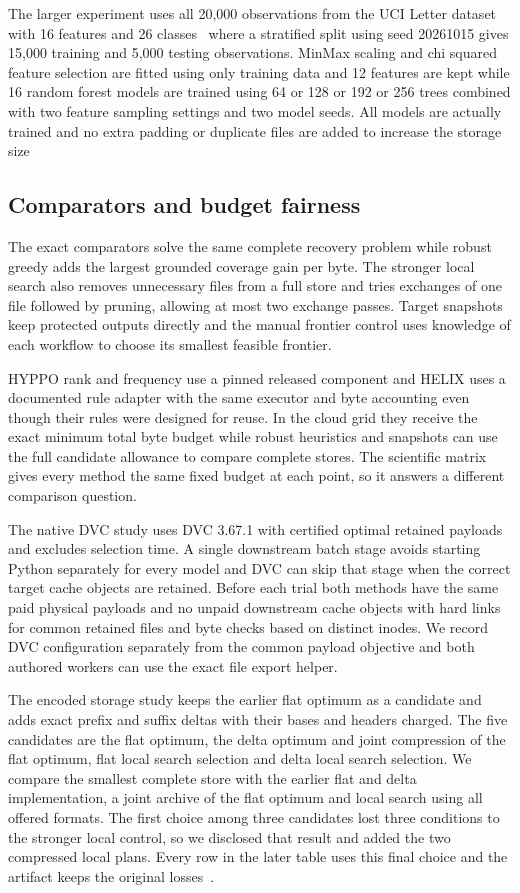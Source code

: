 The larger experiment uses all 20,000 observations from the UCI Letter dataset with 16 features and 26 classes~\cite{letter} where a stratified split using seed 20261015 gives 15,000 training and 5,000 testing observations. MinMax scaling and chi squared feature selection are fitted using only training data and 12 features are kept while 16 random forest models are trained using 64 or 128 or 192 or 256 trees combined with two feature sampling settings and two model seeds. All models are actually trained and no extra padding or duplicate files are added to increase the storage size

\subsection{Comparators and budget fairness}

The exact comparators solve the same complete recovery problem while robust greedy adds the largest grounded coverage gain per byte. The stronger local search also removes unnecessary files from a full store and tries exchanges of one file followed by pruning, allowing at most two exchange passes. Target snapshots keep protected outputs directly and the manual frontier control uses knowledge of each workflow to choose its smallest feasible frontier.

HYPPO rank and frequency use a pinned released component and HELIX uses a documented rule adapter with the same executor and byte accounting even though their rules were designed for reuse. In the cloud grid they receive the exact minimum total byte budget while robust heuristics and snapshots can use the full candidate allowance to compare complete stores. The scientific matrix gives every method the same fixed budget at each point, so it answers a different comparison question.

The native DVC study uses DVC 3.67.1 with certified optimal retained payloads and excludes selection time. A single downstream batch stage avoids starting Python separately for every model and DVC can skip that stage when the correct target cache objects are retained. Before each trial both methods have the same paid physical payloads and no unpaid downstream cache objects with hard links for common retained files and byte checks based on distinct inodes. We record DVC configuration separately from the common payload objective and both authored workers can use the exact file export helper.

The encoded storage study keeps the earlier flat optimum as a candidate and adds exact prefix and suffix deltas with their bases and headers charged. The five candidates are the flat optimum, the delta optimum and joint compression of the flat optimum, flat local search selection and delta local search selection. We compare the smallest complete store with the earlier flat and delta implementation, a joint archive of the flat optimum and local search using all offered formats. The first choice among three candidates lost three conditions to the stronger local control, so we disclosed that result and added the two compressed local plans. Every row in the later table uses this final choice and the artifact keeps the original losses~\cite{artifact}.

